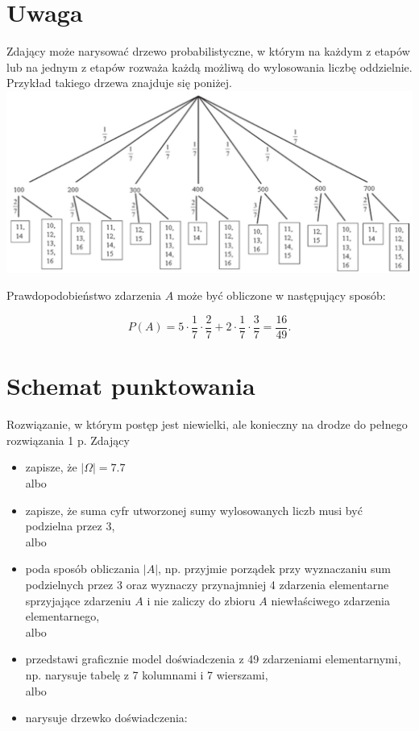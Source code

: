 \documentclass[10pt]{article}
\begin{document}
\section*{Uwaga}
Zdający może narysować drzewo probabilistyczne, w którym na każdym z etapów lub na jednym z etapów rozważa każdą możliwą do wylosowania liczbę oddzielnie. Przykład takiego drzewa znajduje się poniżej.\\
\includegraphics[max width=\textwidth, center]{2025_02_07_a74eed68a1a2147a06fdg-20(1)}

Prawdopodobieństwo zdarzenia $A$ może być obliczone w następujący sposób:

$$
P(A)=5 \cdot \frac{1}{7} \cdot \frac{2}{7}+2 \cdot \frac{1}{7} \cdot \frac{3}{7}=\frac{16}{49} .
$$

\section*{Schemat punktowania}
Rozwiązanie, w którym postęp jest niewielki, ale konieczny na drodze do pełnego rozwiązania 1 p. Zdający

\begin{itemize}
  \item zapisze, że $|\Omega|=7.7$\\
albo
  \item zapisze, że suma cyfr utworzonej sumy wylosowanych liczb musi być podzielna przez 3,\\
albo
  \item poda sposób obliczania $|A|$, np. przyjmie porządek przy wyznaczaniu sum podzielnych przez 3 oraz wyznaczy przynajmniej 4 zdarzenia elementarne sprzyjające zdarzeniu $A$ i nie zaliczy do zbioru $A$ niewłaściwego zdarzenia elementarnego,\\
albo
  \item przedstawi graficznie model doświadczenia z 49 zdarzeniami elementarnymi, np. narysuje tabelę z 7 kolumnami i 7 wierszami,\\
albo
  \item narysuje drzewko doświadczenia:
\end{itemize}
\end{document}

